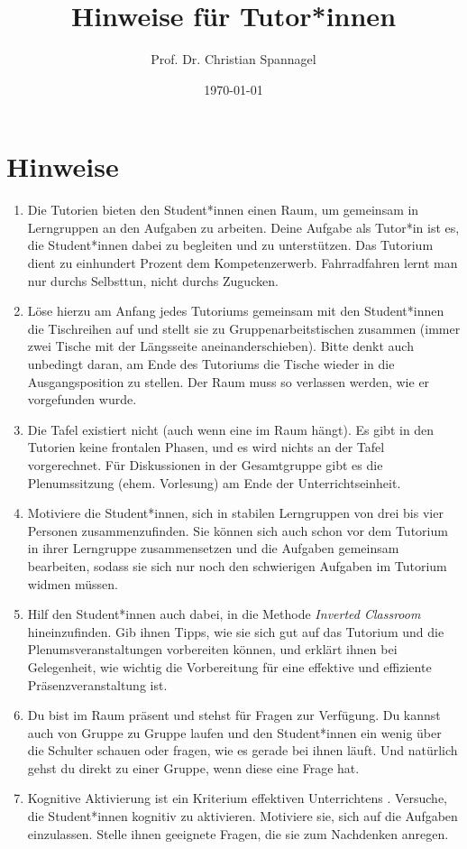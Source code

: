 \documentclass{cssheet}
\title{Hinweise für Tutor*innen}
\author{Prof. Dr. Christian Spannagel}
\date{\today}
\begin{document}
\printtitle

\section* {Hinweise}
\begin{enumerate}
\item Die Tutorien bieten den Student*innen einen Raum, um gemeinsam in Lerngruppen an den Aufgaben zu arbeiten. Deine Aufgabe als Tutor*in ist es, die Student*innen dabei zu begleiten und zu unterstützen. Das Tutorium dient zu einhundert Prozent dem Kompetenzerwerb. Fahrradfahren lernt man nur durchs Selbsttun, nicht durchs Zugucken.
\item Löse hierzu am Anfang jedes Tutoriums gemeinsam mit den Student*innen die Tischreihen auf und stellt sie zu Gruppenarbeitstischen zusammen (immer zwei Tische mit der Längsseite aneinanderschieben). Bitte denkt auch unbedingt daran, am Ende des Tutoriums die Tische wieder in die Ausgangsposition zu stellen. Der Raum muss so verlassen werden, wie er vorgefunden wurde.
\item Die Tafel existiert nicht (auch wenn eine im Raum hängt). Es gibt in den Tutorien keine frontalen Phasen, und es wird nichts an der Tafel vorgerechnet. Für Diskussionen in der Gesamtgruppe gibt es die Plenumssitzung (ehem. Vorlesung) am Ende der Unterrichtseinheit.
\item Motiviere die Student*innen, sich in stabilen Lerngruppen von drei bis vier Personen zusammenzufinden. Sie können sich auch schon vor dem Tutorium in ihrer Lerngruppe zusammensetzen und die Aufgaben gemeinsam bearbeiten, sodass sie sich nur noch den schwierigen Aufgaben im Tutorium widmen müssen.
\item Hilf den Student*innen auch dabei, in die Methode \emph{Inverted Classroom} hineinzufinden. Gib ihnen Tipps, wie sie sich gut auf das Tutorium und die Plenumsveranstaltungen vorbereiten können, und erklärt ihnen bei Gelegenheit, wie wichtig die Vorbereitung für eine effektive und effiziente Präsenzveranstaltung ist.
\item Du bist im Raum präsent und stehst für Fragen zur Verfügung. Du kannst auch von Gruppe zu Gruppe laufen und den Student*innen ein wenig über die Schulter schauen oder fragen, wie es gerade bei ihnen läuft.  Und natürlich gehst du direkt zu einer Gruppe, wenn diese eine Frage hat.
\item Kognitive Aktivierung ist ein Kriterium effektiven Unterrichtens \parencite{praetorius2018}. Versuche, die Student*innen kognitiv zu aktivieren. Motiviere sie, sich auf die Aufgaben einzulassen. Stelle ihnen geeignete Fragen, die sie zum Nachdenken anregen. 

\end{enumerate}
\end{document}

